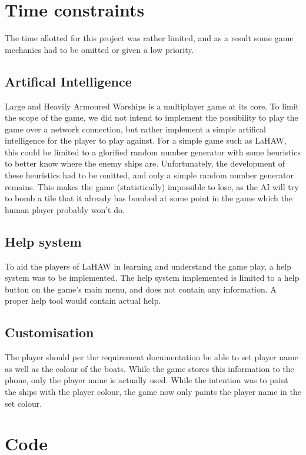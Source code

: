 \section{Time constraints}
The time allotted for this project was rather limited, and as a result some game mechanics had to be omitted or given a low priority.


\subsection{Artifical Intelligence}
Large and Heavily Armoured Warships is a multiplayer game at its core. To limit the scope of the game, we did not intend to implement the possibility to play the game over a network connection, but rather implement a simple artifical intelligence for the player to play against. For a simple game such as LaHAW, this could be limited to a glorified random number generator with some heuristics to better know where the enemy ships are. Unfortunately, the development of these heuristics had to be omitted, and only a simple random number generator remains. This makes the game (statistically) impossible to lose, as the AI will try to bomb a tile that it already has bombed at some point in the game which the human player probably won't do.

\subsection{Help system}
To aid the players of LaHAW in learning and understand the game play, a help system was to be implemented. The help system implemented is limited to a help button on the game's main menu, and does not contain any information. A proper help tool would contain actual help.

\subsection{Customisation}
The player should per the requirement documentation be able to set player name as well as the colour of the boats. While the game stores this information to the phone, only the player name is actually used. While the intention was to paint the ships with the player colour, the game now only paints the player name in the set colour.



\section{Code}
